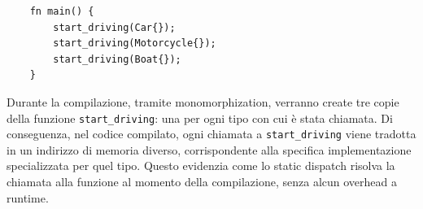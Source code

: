 \begin{verbatim}
    fn main() {
        start_driving(Car{});
        start_driving(Motorcycle{});
        start_driving(Boat{});
    }
\end{verbatim}
Durante la compilazione, tramite monomorphization, verranno create tre copie della funzione \texttt{start\_driving}: una per ogni tipo con cui è stata chiamata. Di conseguenza, nel codice compilato, ogni chiamata a \texttt{start\_driving} viene tradotta in un indirizzo di memoria diverso, corrispondente alla specifica implementazione specializzata per quel tipo. Questo evidenzia come lo static dispatch risolva la chiamata alla funzione al momento della compilazione, senza alcun overhead a runtime.

